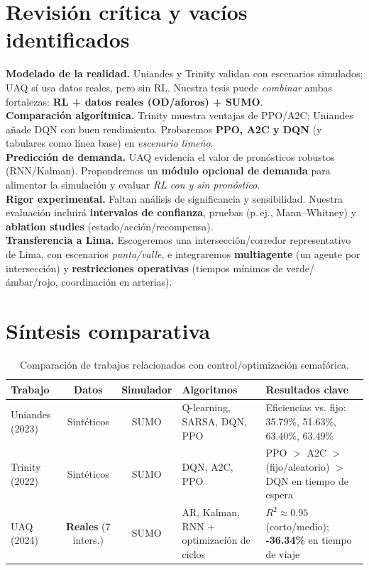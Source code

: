 \section{Revisión crítica y vacíos identificados}
\textbf{Modelado de la realidad.} Uniandes y Trinity validan con escenarios simulados; UAQ sí usa datos reales, pero sin RL. Nuestra tesis puede \textit{combinar} ambas fortalezas: \textbf{RL + datos reales (OD/aforos) + SUMO}. \\
\textbf{Comparación algorítmica.} Trinity muestra ventajas de PPO/A2C; Uniandes añade DQN con buen rendimiento. Probaremos \textbf{PPO, A2C y DQN} (y tabulares como línea base) en \textit{escenario limeño}. \\
\textbf{Predicción de demanda.} UAQ evidencia el valor de pronósticos robustos (RNN/Kalman). Propondremos un \textbf{módulo opcional de demanda} para alimentar la simulación y evaluar \textit{RL con y sin pronóstico}. \\
\textbf{Rigor experimental.} Faltan análisis de significancia y sensibilidad. Nuestra evaluación incluirá \textbf{intervalos de confianza}, pruebas (p.\,ej., Mann–Whitney) y \textbf{ablation studies} (estado/acción/recompensa). \\
\textbf{Transferencia a Lima.} Escogeremos una intersección/corredor representativo de Lima, con escenarios \textit{punta/valle}, e integraremos \textbf{multiagente} (un agente por intersección) y \textbf{restricciones operativas} (tiempos mínimos de verde/ámbar/rojo, coordinación en arterias).

\section{Síntesis comparativa}
\begin{table}[H]
\centering
\footnotesize
\setlength{\tabcolsep}{6pt}
\renewcommand{\arraystretch}{1.2}
\begin{tabularx}{\textwidth}{@{} l c c X X @{}}
\toprule
\textbf{Trabajo} & \textbf{Datos} & \textbf{Simulador} & \textbf{Algoritmos} & \textbf{Resultados clave} \\
\midrule
\makecell[l]{Uniandes (2023)\\ \citep{Chavez2023}}
  & Sintéticos
  & SUMO
  & Q-learning, SARSA, DQN, PPO
  & Eficiencias vs. fijo: 35.79\%, 51.63\%, 63.40\%, 63.49\% \\
\makecell[l]{Trinity (2022)\\ \citep{Chakrabarti2022}}
  & Sintéticos
  & SUMO
  & DQN, A2C, PPO
  & PPO $>$ A2C $>$ (fijo/aleatorio) $>$ DQN en tiempo de espera \\
\makecell[l]{UAQ (2024)\\ \citep{UAQ2024}}
  & \textbf{Reales} (7 inters.)
  & SUMO
  & AR, Kalman, RNN + optimización de ciclos
  & $R^2\approx 0.95$ (corto/medio); \textbf{-36.34\%} en tiempo de viaje \\
\bottomrule
\end{tabularx}
\caption{Comparación de trabajos relacionados con control/optimización semafórica.}
\label{tab:relacionados}
\end{table}


